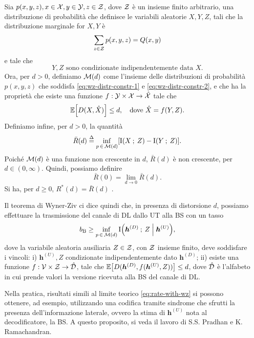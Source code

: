\begin{thm}
    Sia \(p(x,y,z), x \in \mathcal{X}, y \in \mathcal{Y}, z \in \mathcal{Z}\), dove
    \(\mathcal{Z}\) è un insieme finito arbitrario, una distribuzione di
    probabilità che definisce le variabili aleatorie \(X,Y,Z\), tali che la
    distribuzione marginale for \(X,Y\) è
    \begin{equation}
        \sum_{z \in \mathcal{Z}} p(x,y,z) = Q(x,y) \label{eq:wz-distr-constr-1}
    \end{equation}
    e tale che
    \begin{equation}
        Y,Z \textrm{ sono condizionate indipendentemente data } X.
        \label{eq:wz-distr-constr-2}
    \end{equation}
    Ora, per \(d > 0\), definiamo \(\mathcal{M}(d)\) come l'insieme delle
    distribuzioni di probabilità \(p(x,y,z)\) che soddisfa
    \eqref{eq:wz-distr-constr-1} e \eqref{eq:wz-distr-constr-2}, e che ha la
    proprietà che esiste una funzione \(f: \mathcal{Y}\times\mathcal{X} \to
    \hat{\mathcal{X}}\) tale che
    \begin{equation}
        \expect{D(X,\hat{X})} \le d, \quad
        \textrm{dove } \hat{X} = f(Y,Z) .
    \end{equation}
    Definiamo infine, per \(d > 0\), la quantità
    \begin{equation}
        \bar{R}(d) \define \inf_{p\,\in\,\set{M}(d)} \mleft[
            \mutual{X}{Z} - \mutual{Y}{Z}
            \mright] .
    \end{equation}
    Poiché \(\mathcal{M}(d)\) è una funzione non crescente in \(d\), \(\bar{R}(d)\)
    è non crescente, per \(d \in (0,\infty)\). Quindi, possiamo definire
    \begin{equation}
        \bar{R}(0) = \lim_{d\to0} \bar{R}(d) .
    \end{equation}
    Si ha, per \(d \ge 0\), \(R^{*}(d) = \bar{R}(d)\) .
\end{thm}

Il teorema di Wyner-Ziv ci dice quindi che, in presenza di distorsione \(d\),
possiamo effettuare la trasmissione del canale di DL dallo UT alla BS con un
tasso
\begin{equation}
    b_\mathrm{B} \ge \inf_{p\,\in\,\set{M}(d)}
    \mutual{\bm{h}^{(D)}}{Z \given \bm{h}^{(U)}} , \label{eq:rate-with-wz}
\end{equation}
dove la variabile aleatoria ausiliaria \(Z \in \mathcal{Z}\), con \(\mathcal{Z}\)
insieme finito, deve soddisfare i vincoli: i) \(\bm{h}^{(U)},Z\) condizionate
indipendentemente dato \(\bm{h}^{(D)}\); ii) esiste una funzione \(f:
\mathcal{V}\times\mathcal{Z} \to \hat{\mathcal{D}}\), tale che
\(\expect{D(\bm{h}^{(D)},f(\bm{h}^{(U)},Z))} \le d\), dove \(\hat{\mathcal{D}}\) è
l'alfabeto in cui prende valori la versione ricevuta alla BS del canale di DL.

Nella pratica, risultati simili al limite teorico \eqref{eq:rate-with-wz} si
possono ottenere, ad esempio, utilizzando una codifica tramite sindrome che
sfrutti la presenza dell'informazione laterale, ovvero la stima di
\(\bm{h}^{(U)}\) nota al decodificatore, la BS. A questo proposito, si veda il
lavoro di S.S. Pradhan e K. Ramachandran.\cite{1184140}
